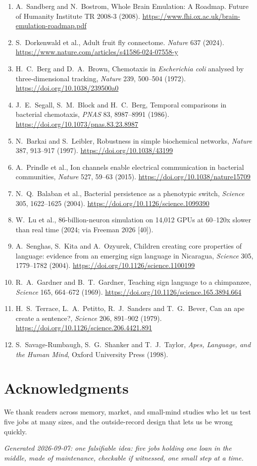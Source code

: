 \documentclass[11pt,a4paper]{article}
\begin{document}
\begin{enumerate}
\item A.~Sandberg and N.~Bostrom, Whole Brain Emulation: A Roadmap. Future of Humanity Institute TR 2008-3 (2008). \url{https://www.fhi.ox.ac.uk/brain-emulation-roadmap.pdf}
\item S.~Dorkenwald et al., Adult fruit fly connectome. \textit{Nature} 637 (2024). \url{https://www.nature.com/articles/s41586-024-07558-y}
\item H.~C.~Berg and D.~A.~Brown, Chemotaxis in \textit{Escherichia coli} analysed by three-dimensional tracking, \textit{Nature} 239, 500--504 (1972). \url{https://doi.org/10.1038/239500a0}
\item J.~E.~Segall, S.~M.~Block and H.~C.~Berg, Temporal comparisons in bacterial chemotaxis, \textit{PNAS} 83, 8987--8991 (1986). \url{https://doi.org/10.1073/pnas.83.23.8987}
\item N.~Barkai and S.~Leibler, Robustness in simple biochemical networks, \textit{Nature} 387, 913--917 (1997). \url{https://doi.org/10.1038/43199}
\item A.~Prindle et al., Ion channels enable electrical communication in bacterial communities, \textit{Nature} 527, 59--63 (2015). \url{https://doi.org/10.1038/nature15709}
\item N.~Q.~Balaban et al., Bacterial persistence as a phenotypic switch, \textit{Science} 305, 1622--1625 (2004). \url{https://doi.org/10.1126/science.1099390}
\item W.~Lu et al., 86-billion-neuron simulation on 14,012 GPUs at 60--120x slower than real time (2024; via Freeman 2026 [40]).
\item A.~Senghas, S.~Kita and A.~Ozyurek, Children creating core properties of language: evidence from an emerging sign language in Nicaragua, \textit{Science} 305, 1779--1782 (2004). \url{https://doi.org/10.1126/science.1100199}
\item R.~A.~Gardner and B.~T.~Gardner, Teaching sign language to a chimpanzee, \textit{Science} 165, 664--672 (1969). \url{https://doi.org/10.1126/science.165.3894.664}
\item H.~S.~Terrace, L.~A.~Petitto, R.~J.~Sanders and T.~G.~Bever, Can an ape create a sentence?, \textit{Science} 206, 891--902 (1979). \url{https://doi.org/10.1126/science.206.4421.891}
\item S.~Savage-Rumbaugh, S.~G.~Shanker and T.~J.~Taylor, \textit{Apes, Language, and the Human Mind}, Oxford University Press (1998).
\end{enumerate}

\section*{Acknowledgments}
We thank readers across memory, market, and small-mind studies who let us test five jobs at many sizes, and the outside-record design that lets us be wrong quickly.

\vspace{1em}
\noindent\textit{Generated 2026-09-07: one falsifiable idea: five jobs holding one loan in the middle, made of maintenance, checkable if witnessed, one small step at a time.}
\end{document}
